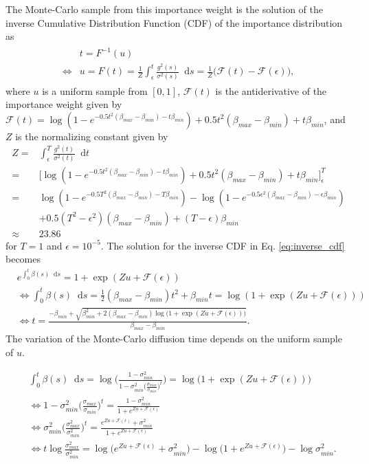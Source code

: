 \documentclass{article}
\theoremstyle{definition}
\theoremstyle{remark}
\newcommand*\diff{\mathop{}\!\mathrm{d}}
\begin{document}
	The Monte-Carlo sample from this importance weight is the solution of the inverse Cumulative Distribution Function (CDF) of the importance distribution as
	\begin{align}\label{eq:inverse_cdf}
	\begin{split}
	&t=F^{-1}(u)\\
	\iff &u=F(t)=\frac{1}{Z}\int_{\epsilon}^{t}\frac{g^{2}(s)}{\sigma^{2}(s)}\diff s=\frac{1}{Z}\big(\mathcal{F}(t)-\mathcal{F}(\epsilon)\big),
	\end{split}
	\end{align}
	where $u$ is a uniform sample from $[0,1]$, $\mathcal{F}(t)$ is the antiderivative of the importance weight given by $\mathcal{F}(t)=\log{(1-e^{-0.5 t^{2}(\beta_{max}-\beta_{min})-t\beta_{min}})}+0.5t^{2}(\beta_{max}-\beta_{min})+t\beta_{min}$, and $Z$ is the normalizing constant given by
	\begin{align*}
	Z=&\int_{\epsilon}^{T}\frac{g^{2}(t)}{\sigma^{2}(t)}\diff t\\
	=&\Big[\log{(1-e^{-0.5 t^{2}(\beta_{max}-\beta_{min})-t\beta_{min}})}+0.5t^{2}(\beta_{max}-\beta_{min})+t\beta_{min}\Big]_{\epsilon}^{T}\\
	=&\log{(1-e^{-0.5T^{2}(\beta_{max}-\beta_{min})-T\beta_{min}})}-\log{(1-e^{-0.5\epsilon^{2}(\beta_{max}-\beta_{min})-\epsilon\beta_{min}})}\\
	&+0.5(T^{2}-\epsilon^{2})(\beta_{max}-\beta_{min})+(T-\epsilon)\beta_{min}\\
	\approx&23.86
	\end{align*}
	for $T=1$ and $\epsilon=10^{-5}$. The solution for the inverse CDF in Eq. \eqref{eq:inverse_cdf} becomes
	\begin{align*}
	&e^{\int_{0}^{t}\beta(s)\diff s}=1+\exp{(Zu+\mathcal{F}(\epsilon))}\\
	&\iff \int_{0}^{t}\beta(s)\diff s=\frac{1}{2}(\beta_{max}-\beta_{min})t^{2}+\beta_{min}t=\log{(1+\exp{(Zu+\mathcal{F}(\epsilon))})}\\
	&\iff t=\frac{-\beta_{min}+\sqrt{\beta_{min}^{2}+2(\beta_{max}-\beta_{min})\log{\big(1+\exp{(Zu+\mathcal{F}(\epsilon))}\big)}}}{\beta_{max}-\beta_{min}}.
	\end{align*}
	The variation of the Monte-Carlo diffusion time depends on the uniform sample of $u$.
	
	\begin{align*}
	&\int_{0}^{t}\beta(s)\diff s=\log{\bigg(\frac{1-\sigma_{min}^{2}}{1-\sigma_{min}^{2}\big(\frac{\sigma_{max}}{\sigma_{min}}\big)^{t}}\bigg)}=\log{\big(1+\exp{(Zu+\mathcal{F}(\epsilon))}\big)}\\
	&\iff 1-\sigma_{min}^{2}\Big( \frac{\sigma_{max}}{\sigma_{min}} \Big)^{t}=\frac{1-\sigma_{min}^{2}}{1+e^{Zu+\mathcal{F}(\epsilon)}}\\
	&\iff \sigma_{min}^{2}\Big(\frac{\sigma_{max}^{2}}{\sigma_{min}^{2}}\Big)^{t}=\frac{e^{Zu+\mathcal{F}(\epsilon)}+\sigma_{min}^{2}}{1+e^{Zu+\mathcal{F}(\epsilon)}}\\
	&\iff t\log{\frac{\sigma_{max}^{2}}{\sigma_{min}^{2}}}=\log{\Big( e^{Zu+\mathcal{F}(\epsilon)}+\sigma_{min}^{2} \Big)}-\log{\Big(1+e^{Zu+\mathcal{F}(\epsilon)}\Big)}-\log{\sigma_{min}^{2}}.
	\end{align*}
	
\end{document}
